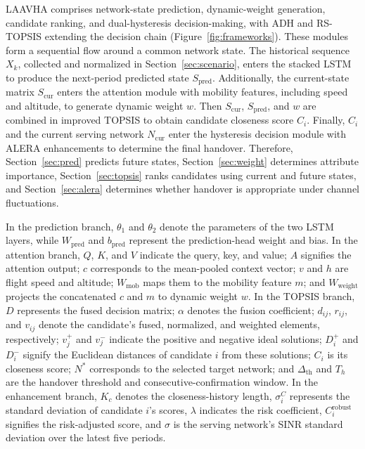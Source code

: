 \documentclass[final,3p,times,twocolumn]{elsarticle}
\begin{document}
LAAVHA comprises network-state prediction, dynamic-weight generation, candidate ranking, and dual-hysteresis decision-making, with ADH and RS-TOPSIS extending the decision chain (Figure~\ref{fig:frameworks}). These modules form a sequential flow around a common network state. The historical sequence $X_k$, collected and normalized in Section~\ref{sec:scenario}, enters the stacked LSTM to produce the next-period predicted state $S_{\mathrm{pred}}$. Additionally, the current-state matrix $S_{\mathrm{cur}}$ enters the attention module with mobility features, including speed and altitude, to generate dynamic weight $w$. Then $S_{\mathrm{cur}}$, $S_{\mathrm{pred}}$, and $w$ are combined in improved TOPSIS to obtain candidate closeness score $C_i$. Finally, $C_i$ and the current serving network $N_{\mathrm{cur}}$ enter the hysteresis decision module with ALERA enhancements to determine the final handover. Therefore, Section~\ref{sec:pred} predicts future states, Section~\ref{sec:weight} determines attribute importance, Section~\ref{sec:topsis} ranks candidates using current and future states, and Section~\ref{sec:alera} determines whether handover is appropriate under channel fluctuations.

In the prediction branch, $\theta_1$ and $\theta_2$ denote the parameters of the two LSTM layers, while $W_{\mathrm{pred}}$ and $b_{\mathrm{pred}}$ represent the prediction-head weight and bias. In the attention branch, $Q$, $K$, and $V$ indicate the query, key, and value; $A$ signifies the attention output; $c$ corresponds to the mean-pooled context vector; $v$ and $h$ are flight speed and altitude; $W_{\mathrm{mob}}$ maps them to the mobility feature $m$; and $W_{\mathrm{weight}}$ projects the concatenated $c$ and $m$ to dynamic weight $w$. In the TOPSIS branch, $D$ represents the fused decision matrix; $\alpha$ denotes the fusion coefficient; $d_{ij}$, $r_{ij}$, and $v_{ij}$ denote the candidate's fused, normalized, and weighted elements, respectively; $v_j^+$ and $v_j^-$ indicate the positive and negative ideal solutions; $D_i^+$ and $D_i^-$ signify the Euclidean distances of candidate $i$ from these solutions; $C_i$ is its closeness score; $N^*$ corresponds to the selected target network; and $\Delta_{\mathrm{th}}$ and $T_h$ are the handover threshold and consecutive-confirmation window. In the enhancement branch, $K_c$ denotes the closeness-history length, $\sigma_i^C$ represents the standard deviation of candidate $i$'s scores, $\lambda$ indicates the risk coefficient, $C_i^{\mathrm{robust}}$ signifies the risk-adjusted score, and $\sigma$ is the serving network's SINR standard deviation over the latest five periods.
\end{document}
